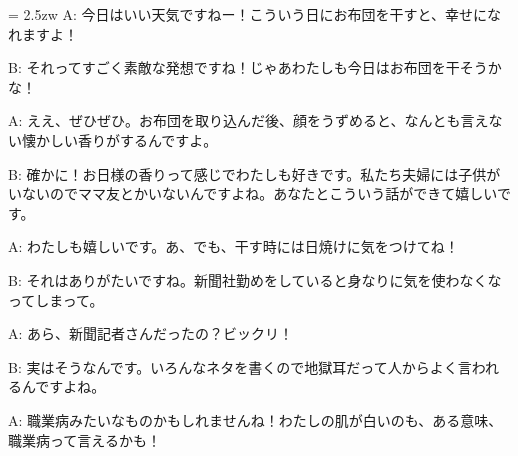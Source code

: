 \documentclass[11pt]{amsart}
\title{}
\author{}
\newenvironment{hangall}[1]{\hangindent = 2.5zw\everypar{\hangindent = 2.5zw}}{}
\begin{document}
\maketitle
\begin{hangall}{}%
A: 今日はいい天気ですねー！こういう日にお布団を干すと、幸せになれますよ！



B: それってすごく素敵な発想ですね！じゃあわたしも今日はお布団を干そうかな！



A: ええ、ぜひぜひ。お布団を取り込んだ後、顔をうずめると、なんとも言えない懐かしい香りがするんですよ。



B: 確かに！お日様の香りって感じでわたしも好きです。私たち夫婦には子供がいないのでママ友とかいないんですよね。あなたとこういう話ができて嬉しいです。



A: わたしも嬉しいです。あ、でも、干す時には日焼けに気をつけてね！



B: それはありがたいですね。新聞社勤めをしていると身なりに気を使わなくなってしまって。



A: あら、新聞記者さんだったの？ビックリ！



B: 実はそうなんです。いろんなネタを書くので地獄耳だって人からよく言われるんですよね。



A: 職業病みたいなものかもしれませんね！わたしの肌が白いのも、ある意味、職業病って言えるかも！\end{hangall}
\end{document}
